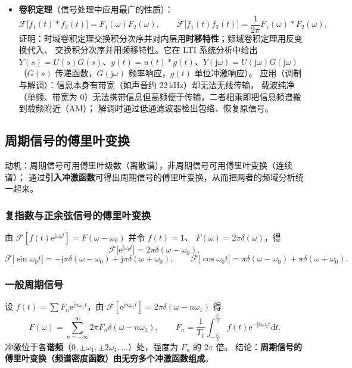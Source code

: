 \begin{itemize}
\item \textbf{卷积定理}（信号处理中应用最广的性质）：
  \begin{equation}
  \mathcal{F}\big[f_1(t)*f_2(t)\big]=F_1(\omega)F_2(\omega),\qquad
  \mathcal{F}\big[f_1(t)f_2(t)\big]=\frac{1}{2\pi}F_1(\omega)*F_2(\omega),
  \end{equation}
  证明：时域卷积定理交换积分次序并对内层用\textbf{时移特性}；频域卷积定理用反变换代入、
  交换积分次序并用频移特性。它在 LTI 系统分析中给出
  $Y(s)=U(s)G(s)$、$y(t)=u(t)*g(t)$、$Y(\mathrm{j}\omega)=U(\mathrm{j}\omega)G(\mathrm{j}\omega)$
  （$G(s)$ 传递函数，$G(\mathrm{j}\omega)$ 频率响应，$g(t)$ 单位冲激响应）。
  应用（调制与解调）：信息本身有带宽（如声音约 $22\,\mathrm{kHz}$）却无法无线传输，
  载波纯净（单频、带宽为 0）无法携带信息但高频便于传输，二者相乘即把信息频谱搬到载频附近（AM）；
  解调时通过低通滤波器检出包络、恢复原信号。
\end{itemize}

\subsection{周期信号的傅里叶变换}

动机：周期信号可用傅里叶级数（离散谱），非周期信号可用傅里叶变换（连续谱）；
通过\textbf{引入冲激函数}可得出周期信号的傅里叶变换，从而把两者的频域分析统一起来。

\subsubsection{复指数与正余弦信号的傅里叶变换}

由 $\mathcal{F}[f(t)\mathrm{e}^{\mathrm{j}\omega_0t}]=F(\omega-\omega_0)$ 并令 $f(t)=1$、
$F(\omega)=2\pi\delta(\omega)$，得
\begin{equation}
\mathcal{F}\big[\mathrm{e}^{\mathrm{j}\omega_0t}\big]=2\pi\delta(\omega-\omega_0),
\end{equation}
\begin{equation}
\mathcal{F}\big[\sin\omega_0t\big]=-\mathrm{j}\pi\delta(\omega-\omega_0)+\mathrm{j}\pi\delta(\omega+\omega_0),\qquad
\mathcal{F}\big[\cos\omega_0t\big]=\pi\delta(\omega-\omega_0)+\pi\delta(\omega+\omega_0).
\end{equation}

\subsubsection{一般周期信号}

设 $f(t)=\sum F_n\mathrm{e}^{\mathrm{j}n\omega_1t}$，由 $\mathcal{F}[\mathrm{e}^{\mathrm{j}n\omega_1t}]
=2\pi\delta(\omega-n\omega_1)$ 得
\begin{equation}
F(\omega)=\sum_{n=-\infty}^{\infty}2\pi F_n\delta(\omega-n\omega_1),
\qquad
F_n=\frac{1}{T_1}\int_{-\frac{T_1}{2}}^{\frac{T_1}{2}}f(t)\mathrm{e}^{-\mathrm{j}n\omega_1t}\mathrm{d}t .
\end{equation}
冲激位于各\textbf{谐频}（$0,\pm\omega_1,\pm2\omega_1,\dots$）处，强度为 $F_n$ 的 $2\pi$ 倍。
结论：\textbf{周期信号的傅里叶变换（频谱密度函数）由无穷多个冲激函数组成}。

